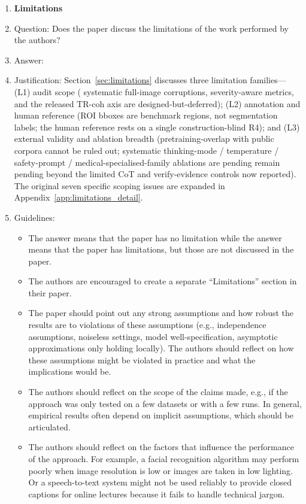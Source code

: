 \documentclass{article}
\providecommand{\DIFaddtex}[1]{{\protect\color{blue} \sf #1}} %
\providecommand{\DIFdeltex}[1]{{\protect\color{red} \scriptsize #1}} %
\providecommand{\DIFaddbegin}{} %
\providecommand{\DIFaddend}{} %
\providecommand{\DIFdelbegin}{} %
\providecommand{\DIFdelend}{} %
\providecommand{\DIFadd}[1]{\texorpdfstring{\DIFaddtex{#1}}{#1}} %
\providecommand{\DIFdel}[1]{\texorpdfstring{\DIFdeltex{#1}}{}} %
\begin{document}
\begin{enumerate}
\item {\bf Limitations}
    \item[] Question: Does the paper discuss the limitations of the work performed by the authors?
    \item[] Answer: \answerYes{}
    \item[] Justification: Section~\ref{sec:limitations} discusses three limitation families---(L1) audit scope (\DIFaddbegin \DIFadd{systematic }\DIFaddend full-image corruptions, severity-aware metrics, and the released TR-coh axis are designed-but-deferred); (L2) annotation and human reference (ROI bboxes are benchmark regions, not segmentation labels; the human reference rests on a single construction-blind \textsc{R4}); and (L3) external validity and ablation breadth (pretraining-overlap with public corpora cannot be ruled out; \DIFaddbegin \DIFadd{systematic }\DIFaddend thinking-mode / temperature / safety-prompt / medical-specialised-family ablations \DIFdelbegin \DIFdel{are pending }\DIFdelend \DIFaddbegin \DIFadd{remain pending beyond the limited CoT and verify-evidence controls now reported}\DIFaddend ). The original seven specific scoping issues are expanded in Appendix~\ref{app:limitations_detail}.
    \item[] Guidelines:
    \begin{itemize}
        \item The answer \answerNA{} means that the paper has no limitation while the answer \answerNo{} means that the paper has limitations, but those are not discussed in the paper.
        \item The authors are encouraged to create a separate ``Limitations'' section in their paper.
        \item The paper should point out any strong assumptions and how robust the results are to violations of these assumptions (e.g., independence assumptions, noiseless settings, model well-specification, asymptotic approximations only holding locally). The authors should reflect on how these assumptions might be violated in practice and what the implications would be.
        \item The authors should reflect on the scope of the claims made, e.g., if the approach was only tested on a few datasets or with a few runs. In general, empirical results often depend on implicit assumptions, which should be articulated.
        \item The authors should reflect on the factors that influence the performance of the approach. For example, a facial recognition algorithm may perform poorly when image resolution is low or images are taken in low lighting. Or a speech-to-text system might not be used reliably to provide closed captions for online lectures because it fails to handle technical jargon.

\end{itemize}
\end{enumerate}
\end{document}
